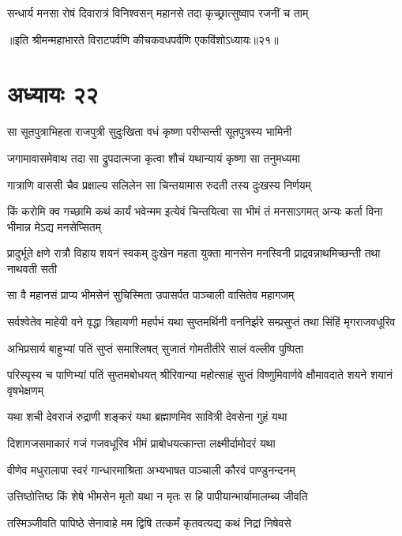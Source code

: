 \twolineshloka
{सन्धार्य मनसा रोषं दिवारात्रं विनिश्वसन्}
{महानसे तदा कृच्छ्रात्सुष्वाप रजनीं च ताम्}

॥इति श्रीमन्महाभारते विराटपर्वणि कीचकवधपर्वणि एकविंशोऽध्यायः॥२१॥

\chapter{अध्यायः २२}

\twolineshloka
{सा सूतपुत्राभिहता राजपुत्री सुदुःखिता}
{वधं कृष्णा परीप्सन्ती सूतपुत्रस्य भामिनी}


\twolineshloka
{जगामावासमेवाथ तदा सा द्रुपदात्मजा}
{कृत्वा शौचं यथान्यायं कृष्णा सा तनुमध्यमा}


\twolineshloka
{गात्राणि वाससी चैव प्रक्षाल्य सलिलेन सा}
{चिन्तयामास रुदती तस्य दुःखस्य निर्णयम्}


\threelineshloka
{किं करोमि क्व गच्छामि कथं कार्यं भवेन्मम}
{इत्येवं चिन्तयित्वा सा भीमं तं मनसाऽगमत्}
{अन्यः कर्ता विना भीमान्न मेऽद्य मनसेप्सितम्}


\threelineshloka
{प्रादुर्भूते क्षणे रात्रौ विहाय शयनं स्वकम्}
{दुःखेन महता युक्ता मानसेन मनस्विनी}
{प्राद्रवन्नाथमिच्छन्ती तथा नाथवती सती}


\twolineshloka
{सा वै महानसं प्राप्य भीमसेनं सुचिस्मिता}
{उपासर्पत पाञ्चाली वासितेव महागजम्}


\threelineshloka
{सर्वश्वेतेव माहेयी वने वृद्धा त्रिहायणी}
{महर्पभं यथा सुप्तमर्थिनी वननिर्झरे}
{सम्प्रसुप्तं तथा सिंहिं मृगराजवधूरिव}


\twolineshloka
{अभिप्रसार्य बाहुभ्यां पतिं सुप्तं समाश्लिषत्}
{सुजातं गोमतीतीरे सालं वल्लीव पुष्पिता}


\threelineshloka
{परिस्पृस्य च पाणिभ्यां पतिं सुप्तमबोधयत्}
{श्रीरिवान्या महोत्साहं सुप्तं विष्णुमिवार्णवे}
{क्षौमावदाते शयने शयानं वृषभेक्षणम्}


\twolineshloka
{यथा शची देवराजं रुद्राणी शङ्करं यथा}
{ब्रह्माणमिव सावित्री देवसेना गुहं यथा}


\twolineshloka
{दिशागजसमाकारं गजं गजवधूरिव}
{भीमं प्राबोधयत्कान्ता लक्ष्मीर्दामोदरं यथा}


\twolineshloka
{वीणेव मधुरालापा स्वरं गान्धारमाश्रिता}
{अभ्यभाषत पाञ्चाली कौरवं पाण्डुनन्दनम्}


\twolineshloka
{उत्तिष्ठोत्तिष्ठ किं शेषे भीमसेन मृतो यथा}
{न मृतः स हि पापीयान्भार्यामालम्ब्य जीवति}


\twolineshloka
{तस्मिञ्जीवति पापिष्ठे सेनावाहे मम द्विषि}
{तत्कर्मं कृतवत्यद्य कथं निद्रां निषेवसे}


